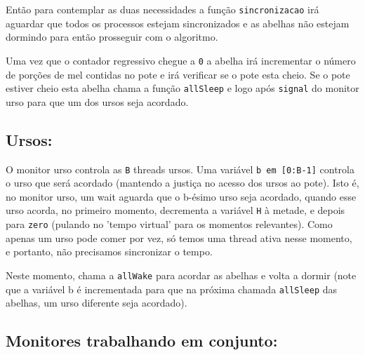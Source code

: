 \documentclass[12pt,a4paper]{article}
\begin{document}
Então para contemplar as duas necessidades a função \verb+sincronizacao+ irá aguardar que todos os processos estejam sincronizados e as abelhas não estejam dormindo para então prosseguir com o algoritmo.

Uma vez que o contador regressivo chegue a \verb+0+ a abelha irá incrementar o número de porções de mel contidas no pote e irá verificar se o pote esta cheio. Se o pote estiver cheio esta abelha chama a função \verb+allSleep+ e logo após \verb+signal+ do monitor urso para que um dos ursos seja acordado.

\subsection{Ursos:}

O monitor urso controla as \verb+B+ threads ursos. 
Uma variável \verb+b em [0:B-1]+ controla o urso que será acordado (mantendo a justiça no acesso dos ursos ao pote). 
Isto é, no monitor urso, um wait aguarda que o b-ésimo urso seja acordado, quando esse urso acorda, no primeiro momento, decrementa a variável \verb+H+ à metade, e depois para \verb+zero+ (pulando no 'tempo virtual' para os momentos relevantes). Como apenas um urso pode comer por vez, só temos uma thread ativa nesse momento, e portanto, não precisamos sincronizar o tempo.

Neste momento, chama a \verb+allWake+ para acordar as abelhas e volta a dormir (note que a variável b é incrementada para que na próxima chamada \verb+allSleep+ das abelhas, um urso diferente seja acordado).

\subsection{Monitores trabalhando em conjunto:}
\end{document}
